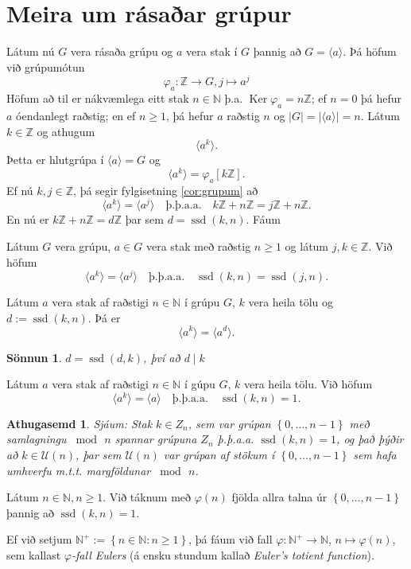 \documentclass[a4paper,icelandic,11pt]{book}
\theoremstyle{plain}
\newtheorem*{ath}{Athugasemd}
\newtheorem*{sonnun}{Sönnun}
\newcommand{\N}{\mathbb{N}}
\newcommand{\Z}{\mathbb{Z}}
\DeclareMathOperator{\ssd}{ssd} %
\DeclareMathOperator{\Ker}{Ker} %
\begin{document}
\section{Meira um rásaðar grúpur}
Látum nú $G$ vera rásaða grúpu og $a$ vera stak í $G$ þannig að $G=\langle a
\rangle$. Þá höfum við grúpumótun
\[
  \varphi_a : \Z\to G, j\mapsto a^j
\]
Höfum að til er nákvæmlega eitt stak $n\in \N$ þ.a. $\Ker\varphi_a = n\Z$; ef $n
= 0$ þá hefur $a$ óendanlegt raðstig; en ef $n\ge 1$, þá hefur $a$ raðstig $n$
og $|G| = |\langle a \rangle| = n$. Látum $k\in \Z$ og athugum
\[
  \langle a^k \rangle.
\]
Þetta er hlutgrúpa í $\langle a \rangle = G$ og
\[
  \langle a^k \rangle = \varphi_a [k\Z].
\]
Ef nú $k,j\in \Z$, þá segir fylgisetning \ref{cor:grupum} að \[
  \langle a^k \rangle
  = \langle a^j \rangle 
  \quad
  \text{þ.þ.a.a.}
  \quad
  k\Z + n\Z = j\Z + n\Z.
\]
En nú er $k\Z + n\Z = d\Z$ þar sem $d = \ssd(k,n)$. Fáum
\begin{fylgisetn}
  Látum $G$ vera grúpu, $a\in G$ vera stak með raðstig $n\ge 1$ og látum $j,k\in
  \Z$. Við höfum
  \[
    \langle a^k \rangle = \langle a^j \rangle
    \quad
    \text{þ.þ.a.a.}
    \quad
    \ssd(k,n) = \ssd(j,n).
  \]
\end{fylgisetn}
\begin{fylgisetn}
  Látum $a$ vera stak af raðstigi $n\in \N$ í grúpu $G$, $k$ vera heila tölu og
  $d:=\ssd(k,n)$. Þá er 
  \[
    \langle a^k \rangle = \langle a^d \rangle.
  \]
\end{fylgisetn}
\begin{sonnun}
  $d = \ssd(d,k)$, því að $d \mid k$
\end{sonnun}
\begin{fylgisetn}
  Látum $a$ vera stak af raðstigi $n\in \N$ í gúpu $G$, $k$ vera heila tölu. Við
  höfum
 \[
 \langle a^k \rangle  = \langle a \rangle
 \quad \text{þ.þ.a.a.} \quad
 \ssd(k,n) = 1.
 \]
\end{fylgisetn}
\begin{ath}
  Sjáum: Stak $k\in Z_n$, sem var grúpan $\left\{ 0,\dots,n-1 \right\}$ með
  samlagningu $\bmod \, n$ spannar grúpuna $Z_n$ þ.þ.a.a. $\ssd(k,n)=1$, og það
  þýðir að $k\in \mathcal U(n)$, þar sem $\mathcal U(n)$ var grúpan af stökum í
  $\left\{ 0,\dots,n-1 \right\}$ sem hafa umhverfu m.t.t. margföldunar $\bmod\,
  n$.
\end{ath}
\begin{skilgr}
  Látum $n\in \N, n\ge 1$. Við táknum með $\varphi(n)$ fjölda allra talna úr
  $\left\{ 0,\dots,n-1 \right\}$ þannig að $\ssd(k,n) = 1$.

  Ef við setjum $\N^+ := \left\{ n\in \N: n\ge 1 \right\}$, þá fáum við fall
  $\varphi:\N^+\to \N$, $n\mapsto \varphi(n)$, sem kallast \emph{$\varphi$-fall
  Eulers}
  (á ensku stundum kallað \emph{Euler's totient function}).
\end{skilgr}
\end{document}
